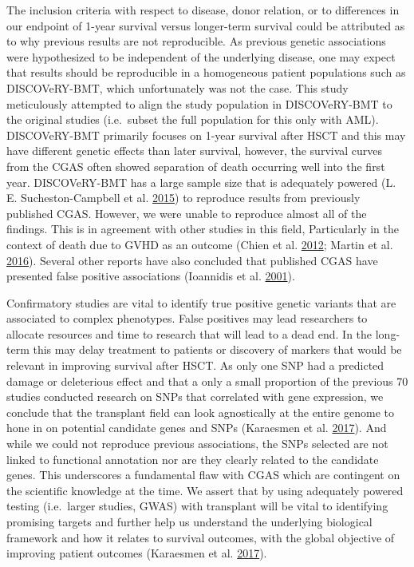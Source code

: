 \documentclass[]{DissertateOSU}
\begin{document}
The inclusion criteria with respect to disease, donor relation, or to
differences in our endpoint of 1-year survival versus longer-term
survival could be attributed as to why previous results are not
reproducible. As previous genetic associations were hypothesized to be
independent of the underlying disease, one may expect that results
should be reproducible in a homogeneous patient populations such as
DISCOVeRY-BMT, which unfortunately was not the case. This study
meticulously attempted to align the study population in DISCOVeRY-BMT to
the original studies (i.e.~subset the full population for this only with
AML). DISCOVeRY-BMT primarily focuses on 1-year survival after HSCT and
this may have different genetic effects than later survival, however,
the survival curves from the CGAS often showed separation of death
occurring well into the first year. DISCOVeRY-BMT has a large sample
size that is adequately powered (L. E. Sucheston-Campbell et al.
\protect\hyperlink{ref-lsc_2015}{2015}) to reproduce results from
previously published CGAS. However, we were unable to reproduce almost
all of the findings. This is in agreement with other studies in this
field, Particularly in the context of death due to GVHD as an outcome
(Chien et al. \protect\hyperlink{ref-chien_2012}{2012}; Martin et al.
\protect\hyperlink{ref-martin_2016}{2016}). Several other reports have
also concluded that published CGAS have presented false positive
associations (Ioannidis et al.
\protect\hyperlink{ref-Ioannidis_2001}{2001}).

Confirmatory studies are vital to identify true positive genetic
variants that are associated to complex phenotypes. False positives may
lead researchers to allocate resources and time to research that will
lead to a dead end. In the long-term this may delay treatment to
patients or discovery of markers that would be relevant in improving
survival after HSCT. As only one SNP had a predicted damage or
deleterious effect and that a only a small proportion of the previous 70
studies conducted research on SNPs that correlated with gene expression,
we conclude that the transplant field can look agnostically at the
entire genome to hone in on potential candidate genes and SNPs
(Karaesmen et al. \protect\hyperlink{ref-Karaesmen_2017}{2017}). And
while we could not reproduce previous associations, the SNPs selected
are not linked to functional annotation nor are they clearly related to
the candidate genes. This underscores a fundamental flaw with CGAS which
are contingent on the scientific knowledge at the time. We assert that
by using adequately powered testing (i.e.~larger studies, GWAS) with
transplant will be vital to identifying promising targets and further
help us understand the underlying biological framework and how it
relates to survival outcomes, with the global objective of improving
patient outcomes (Karaesmen et al.
\protect\hyperlink{ref-Karaesmen_2017}{2017}).
\end{document}
